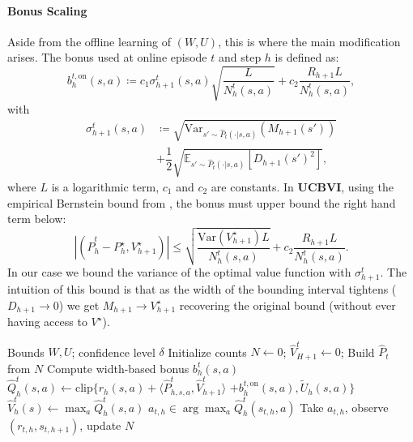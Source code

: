 \documentclass[twoside]{article}
\newcommand{\on}{\mathrm{on}} %
\newcommand{\bont}{b_h^{t,\on}} %
\newcommand{\highq}{\widetilde{U}} %
\newcommand{\lowv}{W} %
\newcommand{\highv}{U} %
\begin{document}
\paragraph{Bonus Scaling}
Aside from the offline learning of $(\lowv, \highv)$, this is where the main modification arises. The bonus used at online episode $t$ and step $h$ is defined as:
\begin{equation}
    \bont(s,a) \coloneqq
c_1 \sigma_{h+1}^t(s,a) \sqrt{\frac{ L}{N_h^t(s,a)}} + 
c_2 \frac{R_{h+1} L}{N_h^t(s,a)},
\end{equation}
with
\begin{align*}
\sigma_{h+1}^t(s,a) & \coloneqq \sqrt{\mathrm{Var}_{s'\sim\widehat{P}_t(\cdot|s,a)} (M_{h+1}(s') )}\\ 
& + \dfrac12\sqrt{\mathbb{E}_{s'\sim\widehat{P}_t(\cdot|s,a)} [D_{h+1}(s')^2 ]},
\end{align*}
%
where $L$ is a logarithmic term, $c_1$ and $c_2$ are constants.
In \textbf{UCBVI}, using the empirical Bernstein bound from  \cite{maurer_empirical_2009}, the bonus must upper bound the right hand term below:
\[ |(\widehat{P}^t_h - P_h^\star, V^\star_{h+1})| \leq \sqrt{\frac{\mathrm{Var}(V^\star_{h+1})L}{N_h^t(s,a)}} + 
c_2 \frac{R_{h+1} L}{N_h^t(s,a)}.\]
In our case we bound the variance of the optimal value function with $\sigma_{h+1}^t$. The intuition of this bound is that as the width of the bounding interval tightens ($D_{h+1} \to 0$) we get $M_{h+1} \to V_{h+1}^\star$ recovering the original bound (without ever having access to $V^\star$).

\begin{algorithm}[h!]
\caption{$Q$-shaping}
\label{alg:q_shaping}
\begin{algorithmic}[1]
\Require Bounds $\lowv, \highv$; confidence level $\delta$
\State Initialize counts $N \gets 0$; $\widehat{V}_{H+1}^{t} \gets 0$;
    \State Build $\widehat{P}_t$ from $N$
            \State Compute width-based bonus $b_h^{t}(s,a)$
            \State $\widehat{Q}_h^t(s,a) \gets \mathrm{clip} \Big\{ r_h(s,a) {+} \langle \widehat{P}^t_{h,s,a}, \widehat{V}_{h+1}^t \rangle$
            \Statex \hspace{10.0em}${+} \bont(s,a), \highq_h(s,a) \Big\}$
        \EndFor
            \State $\widehat{V}_h^t(s) \gets \max_{a} \widehat{Q}_h^t(s,a)$
        \EndFor
    \EndFor
        \State $a_{t,h} \in \arg\max_{a} \widehat{Q}_h^t(s_{t,h}, a)$
        \State Take $a_{t,h}$, observe $(r_{t,h}, s_{t,h+1})$, update $N$
    \EndFor
\EndFor
\end{algorithmic}
\end{algorithm}
\end{document}
